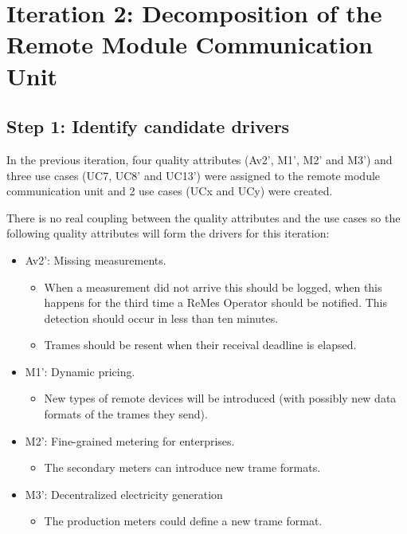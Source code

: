 \section{Iteration 2: Decomposition of the Remote Module Communication Unit}
\label{add:it2}

\subsection{Step 1: Identify candidate drivers}
\label{add:it2/drivers}

\npar In the previous iteration, four quality attributes (Av2', M1', M2' and
M3') and three use cases (UC7, UC8' and UC13') were assigned to the remote
module communication unit and 2 use cases (UCx and UCy) were created. 

\npar There is no real coupling between the quality attributes and the use cases
so the following quality attributes will form the drivers for this
iteration:

\begin{itemize}
  \item Av2': Missing measurements.
  \begin{itemize}
    \item When a measurement did not arrive this should be logged, when
  this happens for the third time a ReMes Operator should be notified. This
  detection should occur in less than ten minutes.
	\item Trames should be resent when their receival deadline is elapsed.
  \end{itemize}
  \item M1': Dynamic pricing.
  \begin{itemize}
    \item New types of remote devices will be introduced (with possibly new
    data formats of the trames they send).
  \end{itemize}
  \item M2': Fine-grained metering for enterprises.
  \begin{itemize}
    \item The secondary meters can introduce new trame formats.
  \end{itemize}
  \item M3': Decentralized electricity generation
  \begin{itemize}
    \item The production meters could define a new trame format.
  \end{itemize}
\end{itemize}

